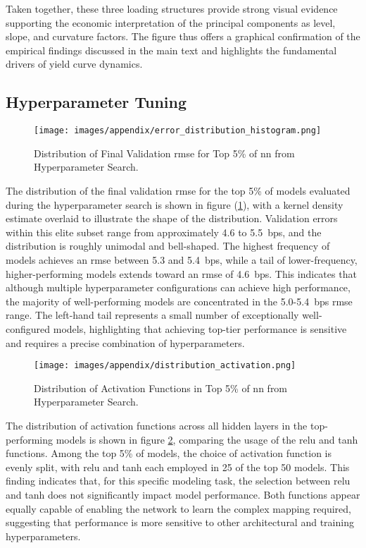Taken together, these three loading structures provide strong visual evidence supporting the economic interpretation of the principal components as level, slope, and curvature factors. The figure thus offers a graphical confirmation of the empirical findings discussed in the main text and highlights the fundamental drivers of yield curve dynamics.

\subsection{Hyperparameter Tuning}
\begin{figure}[H]
	\centering
	\texttt{[image: images/appendix/error\_distribution\_histogram.png]}
	\caption{Distribution of Final Validation \ac{rmse} for Top 5\% of \ac{nn} from Hyperparameter Search.}
	\label{fig:error_distribution_histogram}
\end{figure}
The distribution of the final validation \ac{rmse} for the top 5\% of models evaluated during the hyperparameter search is shown in figure (\ref{fig:error_distribution_histogram}), with a kernel density estimate overlaid to illustrate the shape of the distribution. Validation errors within this elite subset range from approximately 4.6 to 5.5~\ac{bps}, and the distribution is roughly unimodal and bell-shaped. The highest frequency of models achieves an \ac{rmse} between 5.3 and 5.4~\ac{bps}, while a tail of lower-frequency, higher-performing models extends toward an \ac{rmse} of 4.6~\ac{bps}. This indicates that although multiple hyperparameter configurations can achieve high performance, the majority of well-performing models are concentrated in the 5.0-5.4~\ac{bps} \ac{rmse} range. The left-hand tail represents a small number of exceptionally well-configured models, highlighting that achieving top-tier performance is sensitive and requires a precise combination of hyperparameters.

\begin{figure}[H]
	\centering
	\texttt{[image: images/appendix/distribution\_activation.png]}
	\caption{Distribution of Activation Functions in Top 5\% of \ac{nn} from Hyperparameter Search.}
	\label{fig:distribution_activation}
\end{figure}
The distribution of activation functions across all hidden layers in the top-performing models is shown in figure \ref{fig:distribution_activation}, comparing the usage of the \ac{relu} and \ac{tanh} functions. Among the top 5\% of models, the choice of activation function is evenly split, with \ac{relu} and \ac{tanh} each employed in 25 of the top 50 models. This finding indicates that, for this specific modeling task, the selection between \ac{relu} and \ac{tanh} does not significantly impact model performance. Both functions appear equally capable of enabling the network to learn the complex mapping required, suggesting that performance is more sensitive to other architectural and training hyperparameters.

